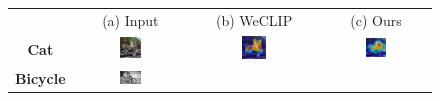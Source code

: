 \begin{figure}[ht]
  \centering
  \setlength{\tabcolsep}{2pt} %
  \renewcommand{\arraystretch}{0.9}

  \begin{tcolorbox}[colframe=black!60, colback=white, boxrule=0.8pt, arc=2pt, left=2pt, right=2pt, top=2pt, bottom=2pt]
    \centering
    \begin{tabular}{c c c c} %

       & (a) Input                                                    & (b) WeCLIP & (c) Ours
      \\
      [1mm]

      {\textbf{Cat}}
       & \includegraphics[width=0.20\textwidth,height=0.20\textwidth]
      {figures/originals/2007_003778.jpg}
       & \includegraphics[width=0.20\textwidth,height=0.20\textwidth]
      {figures/val_cams/weclip/2007_003778_7.jpg}
       & \includegraphics[width=0.20\textwidth,height=0.20\textwidth]
      {figures/val_cams/ours/2007_003778_7.jpg}
      \\
      \textbf{Bicycle}
       & \includegraphics[width=0.20\textwidth,height=0.20\textwidth]
      {figures/originals/2011_000453.jpg}

\end{tabular}
\end{tcolorbox}
\end{figure}
